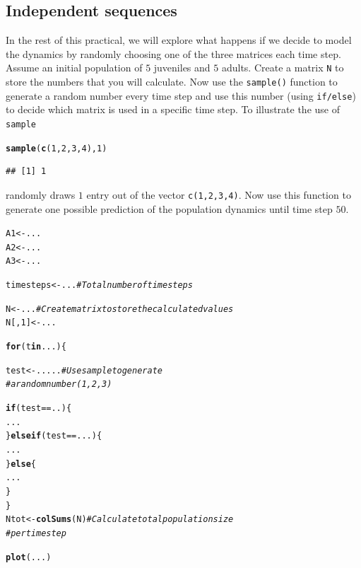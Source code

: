 \documentclass{article}\usepackage[]{graphicx}\usepackage[]{color}
\makeatletter
\newcommand{\hlnum}[1]{\textcolor[rgb]{0.686,0.059,0.569}{#1}}%
\newcommand{\hlcom}[1]{\textcolor[rgb]{0.678,0.584,0.686}{\textit{#1}}}%
\newcommand{\hlopt}[1]{\textcolor[rgb]{0,0,0}{#1}}%
\newcommand{\hlstd}[1]{\textcolor[rgb]{0.345,0.345,0.345}{#1}}%
\newcommand{\hlkwa}[1]{\textcolor[rgb]{0.161,0.373,0.58}{\textbf{#1}}}%
\newcommand{\hlkwb}[1]{\textcolor[rgb]{0.69,0.353,0.396}{#1}}%
\newcommand{\hlkwd}[1]{\textcolor[rgb]{0.737,0.353,0.396}{\textbf{#1}}}%
\newenvironment{kframe}{%
 \def\at@end@of@kframe{}%
 \ifinner\ifhmode%
  \def\at@end@of@kframe{\end{minipage}}%
  \begin{minipage}{\columnwidth}%
 \fi\fi%
 \def\FrameCommand##1{\hskip\@totalleftmargin \hskip-\fboxsep
 \colorbox{shadecolor}{##1}\hskip-\fboxsep
     \hskip-\linewidth \hskip-\@totalleftmargin \hskip\columnwidth}%
 \MakeFramed {\advance\hsize-\width
   \@totalleftmargin\z@ \linewidth\hsize
   \@setminipage}}%
 {\par\unskip\endMakeFramed%
 \at@end@of@kframe}
\newenvironment{knitrout}{}{} %
\makeatother
\begin{document}
\subsection{Independent sequences}
In the rest of this practical, we will explore what happens if we decide to model the dynamics by randomly choosing one of the three matrices each time step. Assume an initial population of $5$ juveniles and $5$ adults. Create a matrix \texttt{N} to store the numbers that you will calculate. Now use the \texttt{sample()} function to generate a random number every time step and use this number (using \texttt{if/else}) to decide which matrix is used in a specific time step. To illustrate the use of \texttt{sample}
\begin{knitrout}
\color{fgcolor}\begin{kframe}
\begin{alltt}
\hlkwd{sample}\hlstd{(}\hlkwd{c}\hlstd{(}\hlnum{1}\hlstd{,}\hlnum{2}\hlstd{,}\hlnum{3}\hlstd{,}\hlnum{4}\hlstd{),}\hlnum{1}\hlstd{)}
\end{alltt}
\begin{verbatim}
## [1] 1
\end{verbatim}
\end{kframe}
\end{knitrout}
randomly draws $1$ entry out of the vector \texttt{c(1,2,3,4)}. Now use this function to generate one possible prediction of the population dynamics until time step $50$.
\begin{knitrout}
\color{fgcolor}\begin{kframe}
\begin{alltt}
\hlstd{A1}\hlkwb{<-}\hlstd{...}
\hlstd{A2}\hlkwb{<-}\hlstd{...}
\hlstd{A3}\hlkwb{<-}\hlstd{...}

\hlstd{timesteps}\hlkwb{<-}\hlstd{...} \hlcom{# Total number of timesteps}

\hlstd{N}\hlkwb{<-}\hlstd{...} \hlcom{# Create matrix to store the calculated values}
\hlstd{N[,}\hlnum{1}\hlstd{]}\hlkwb{<-}\hlstd{...}

\hlkwa{for}\hlstd{(t} \hlkwa{in} \hlstd{...)\{}

  \hlstd{test}\hlkwb{<-}\hlstd{.....} \hlcom{# Use sample to generate }
              \hlcom{# a random number (1,2,3)}

  \hlkwa{if}\hlstd{(test}\hlopt{==}\hlstd{..)\{}
    \hlstd{...}
  \hlstd{\}}\hlkwa{else if}\hlstd{(test}\hlopt{==}\hlstd{...)\{}
    \hlstd{...}
  \hlstd{\}}\hlkwa{else}\hlstd{\{}
    \hlstd{...}
  \hlstd{\}}
\hlstd{\}}
\hlstd{Ntot}\hlkwb{<-}\hlkwd{colSums}\hlstd{(N)}  \hlcom{# Calculate total population size}
                  \hlcom{# per timestep}

\hlkwd{plot}\hlstd{(...)}
\end{alltt}
\end{kframe}
\end{knitrout}
\end{document}
